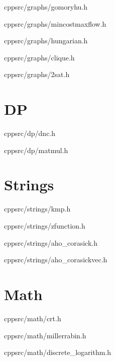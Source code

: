 \documentclass[portrait, 8pt, a4paper, oneside, twocolumn]{extarticle}
\begin{document}
    {}
    {}
    {cpp}{src/graphs/gomoryhu.h}
    \noindent\hrulefill

    {}
    {}
    {cpp}{src/graphs/mincostmaxflow.h}
    \noindent\hrulefill

    {}
    {}
    {cpp}{src/graphs/hungarian.h}
    \noindent\hrulefill

    {}
    {}
    {cpp}{src/graphs/clique.h}
    \noindent\hrulefill

    {}
    {}
    {cpp}{src/graphs/2sat.h}
    \noindent\hrulefill

\section{DP}
    {}
    {}
    {cpp}{src/dp/dnc.h}
    \noindent\hrulefill

    {}
    {}
    {cpp}{src/dp/matmul.h}
    \noindent\hrulefill

\section{Strings}

    {}
    {}
    {cpp}{src/strings/kmp.h}
    \noindent\hrulefill

    {}
    {}
    {cpp}{src/strings/zfunction.h}
    \noindent\hrulefill

    {}
    {}
    {cpp}{src/strings/aho_corasick.h}
    \noindent\hrulefill

    {}
    {}
    {cpp}{src/strings/aho_corasickvec.h}
    \noindent\hrulefill

    
\section{Math}

    {}
    {}
    {cpp}{src/math/crt.h}
    \noindent\hrulefill

    {}
    {}
    {cpp}{src/math/millerrabin.h}
    \noindent\hrulefill

    {}
    {}
    {cpp}{src/math/discrete_logarithm.h}
    \noindent\hrulefill
\end{document}
